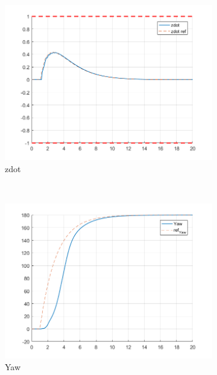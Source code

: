 \documentclass[11pt]{article}
\begin{document}
\begin{enumerate}
\begin{figure}[ht]
        \begin{subfigure}[c]{0.3\linewidth}
            \centering
            \includegraphics[width=\linewidth]{Plots_07_NonlinearModel_ReferenceTracking/04}
            \caption{zdot}
        \end{subfigure}
        ~
        \begin{subfigure}[c]{0.3\linewidth}
            \centering
            \includegraphics[width=\linewidth]{Plots_07_NonlinearModel_ReferenceTracking/05}
            \caption{Yaw}
        \end{subfigure}
        ~
        \begin{subfigure}[c]{0.3\linewidth}
            \centering

\end{subfigure}
\end{figure}
\end{enumerate}
\end{document}
